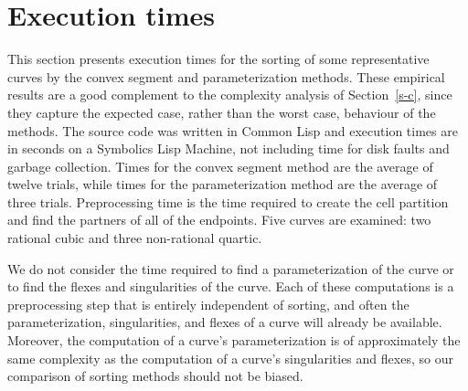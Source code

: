 \section{Execution times}
\label{data}
This section presents execution times for the sorting of some representative
curves by the convex segment and parameterization methods.
These empirical results are a good complement to the complexity analysis 
of Section~\ref{s-c}, since they capture the expected case, rather than 
the worst case, behaviour of the methods.
The source code was written in Common Lisp and
execution times are in seconds on a Symbolics Lisp Machine, 
not including time for disk faults and garbage collection.
Times for the convex segment method are the average of twelve trials, 
while times for the parameterization method are the average of three trials.
Preprocessing time is the time required to create the cell partition 
and find the partners of all of the endpoints.
Five curves are examined: two rational cubic and three non-rational quartic.

We do not consider the time required to find a parameterization of the
curve or to find the flexes and singularities of the curve.
Each of these computations is a preprocessing step that is 
entirely independent of sorting, and often the parameterization, singularities, 
and flexes of a curve will already be available.
Moreover, the computation of a curve's parameterization is of approximately the same
complexity as the computation of a curve's singularities and flexes,
so our comparison of sorting methods should not be biased.

